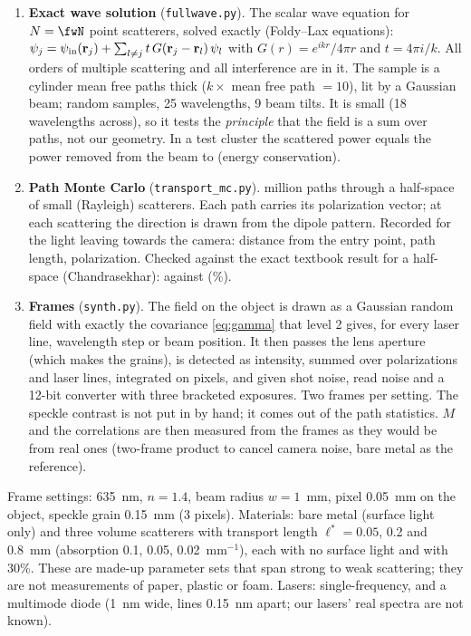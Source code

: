 \documentclass[11pt]{article}
\begin{document}
\begin{enumerate}
\item \textbf{Exact wave solution} (\texttt{fullwave.py}). The scalar wave equation for $N=\fwN$ point scatterers,
  solved exactly (Foldy--Lax equations): $\psi_j=\psi_{\rm in}(\mathbf{r}_j)+\sum_{l\ne j}t\,G(\mathbf{r}_j-\mathbf{r}_l)\,\psi_l$
  with $G(r)=e^{ikr}/4\pi r$ and $t=4\pi i/k$. All orders of multiple scattering and all interference are in it.
  The sample is a cylinder \fwThick{} mean free paths thick ($k\times$ mean free path $=10$), lit by a Gaussian beam;
  \fwSamples{} random samples, 25 wavelengths, 9 beam tilts. It is small (18 wavelengths across), so it tests the
  \emph{principle} that the field is a sum over paths, not our geometry. In a test cluster the scattered power equals
  the power removed from the beam to \fwEnergy{} (energy conservation).
\item \textbf{Path Monte Carlo} (\texttt{transport\_mc.py}). \mcPhotons{} million paths through a half-space of small
  (Rayleigh) scatterers. Each path carries its polarization vector; at each scattering the direction is drawn from
  the dipole pattern. Recorded for the light leaving towards the camera: distance from the entry point, path length,
  polarization. Checked against the exact textbook result for a half-space (Chandrasekhar): \mcNormal{} against
  \mcExact{} (\mcDevPct\%).
\item \textbf{Frames} (\texttt{synth.py}). The field on the object is drawn as a Gaussian random field with exactly
  the covariance \eqref{eq:gamma} that level 2 gives, for every laser line, wavelength step or beam position. It then
  passes the lens aperture (which makes the grains), is detected as intensity, summed over polarizations and laser
  lines, integrated on pixels, and given shot noise, read noise and a 12-bit converter with three bracketed exposures.
  Two frames per setting. The speckle contrast is not put in by hand; it comes out of the path statistics. $M$ and the
  correlations are then measured from the frames as they would be from real ones (two-frame product to cancel camera
  noise, bare metal as the reference).
\end{enumerate}
Frame settings: 635~nm, $n=1.4$, beam radius $w=1$~mm, pixel 0.05~mm on the object, speckle grain 0.15~mm (3
pixels). Materials: bare metal (surface light only) and three volume scatterers with transport length
$\ell^*=0.05$, 0.2 and 0.8~mm (absorption 0.1, 0.05, 0.02~mm$^{-1}$), each with no surface light and with 30\%.
These are made-up parameter sets that span strong to weak scattering; they are not measurements of paper, plastic or
foam. Lasers: single-frequency, and a multimode diode (1~nm wide, lines 0.15~nm apart; our lasers' real spectra are
not known).
\end{document}
